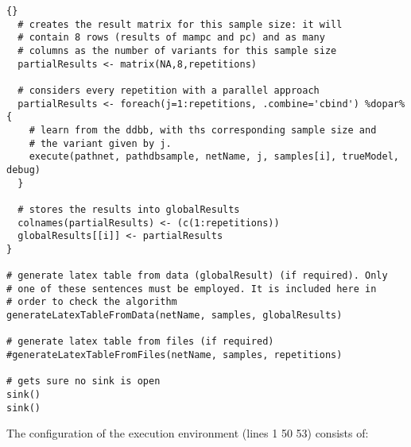 \documentclass[11pt,professionalfont]{article}
\begin{document}
\begin{small}
\begin{lstlisting}[]{}
  # creates the result matrix for this sample size: it will
  # contain 8 rows (results of mampc and pc) and as many
  # columns as the number of variants for this sample size
  partialResults <- matrix(NA,8,repetitions)
  
  # considers every repetition with a parallel approach
  partialResults <- foreach(j=1:repetitions, .combine='cbind') %dopar% {
    # learn from the ddbb, with ths corresponding sample size and
    # the variant given by j. 
    execute(pathnet, pathdbsample, netName, j, samples[i], trueModel, debug)
  }
  
  # stores the results into globalResults
  colnames(partialResults) <- (c(1:repetitions))
  globalResults[[i]] <- partialResults
}

# generate latex table from data (globalResult) (if required). Only
# one of these sentences must be employed. It is included here in
# order to check the algorithm
generateLatexTableFromData(netName, samples, globalResults)

# generate latex table from files (if required)
#generateLatexTableFromFiles(netName, samples, repetitions)

# gets sure no sink is open
sink()
sink()
\end{lstlisting}
\end{small}
  
The configuration of the execution environment (lines 1 50 53) consists of:
\end{document}
